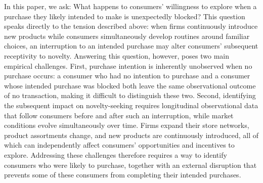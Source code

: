 \documentclass[11 pt]{article}
\begin{document}
In this paper, we ask: What happens to consumers' willingness to explore when a purchase they likely intended to make is unexpectedly blocked? This question speaks directly to the tension described above: when firms continuously introduce new products while consumers simultaneously develop routines around familiar choices, an interruption to an intended purchase may alter consumers' subsequent receptivity to novelty. Answering this question, however, poses two main empirical challenges. First, purchase intention is inherently unobserved when no purchase occurs: a consumer who had no intention to purchase and a consumer whose intended purchase was blocked both leave the same observational outcome of no transaction, making it difficult to distinguish these two. Second, identifying the subsequent impact on novelty-seeking requires longitudinal observational data that follow consumers before and after such an interruption, while market conditions evolve simultaneously over time. Firms expand their store networks, product assortments change, and new products are continuously introduced, all of which can independently affect consumers' opportunities and incentives to explore. Addressing these challenges therefore requires a way to identify consumers who were likely to purchase, together with an external disruption that prevents some of these consumers from completing their intended purchases.
\end{document}
